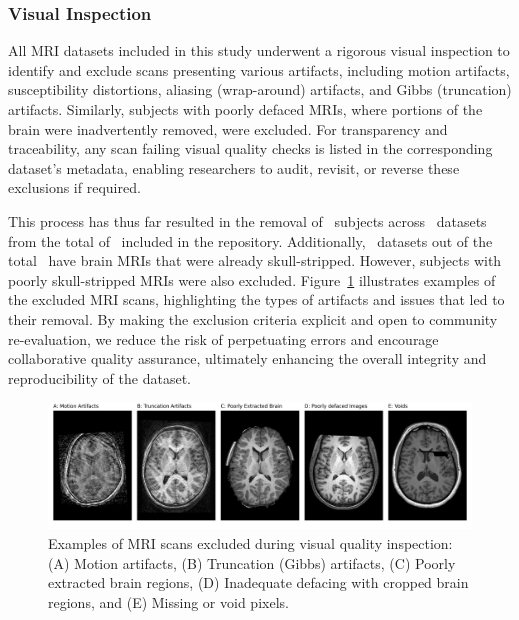 \subsubsection{Visual Inspection}



All MRI datasets included in this study underwent a rigorous visual inspection to identify and exclude scans presenting various artifacts, 
including motion artifacts, susceptibility distortions, aliasing (wrap-around) artifacts, and Gibbs (truncation) artifacts. 
Similarly, subjects with poorly defaced MRIs, where portions of the brain were inadvertently removed, were excluded. For transparency and 
traceability, any scan failing visual quality checks is listed in the corresponding dataset's metadata, enabling researchers to audit, 
revisit, or reverse these exclusions if required.


This process has thus far resulted in the removal of \TotalNumSubjectsRemoved\ subjects across \TotalNumDatasetsWithSubjectsRemoved\ datasets 
from the total of \NumDatasets\ included in the repository. Additionally, \NumDatasetsAlreadySkullStripped\ datasets out of the total \NumDatasets\ 
have brain MRIs that were already skull-stripped. However, subjects with poorly skull-stripped MRIs were also excluded. Figure~\ref{dropped_subject} 
illustrates examples of the excluded MRI scans, highlighting the types of artifacts and issues that led to their removal. By making the exclusion 
criteria explicit and open to community re-evaluation, we reduce the risk of perpetuating errors and encourage collaborative quality assurance, 
ultimately enhancing the overall integrity and reproducibility of the dataset.


\begin{figure}[htbp]\begin{center}\includegraphics[width=\linewidth]{figures/dropped_subjects.png}
    \caption{
        Examples of MRI scans excluded during visual quality inspection:
        (A) Motion artifacts, 
        (B) Truncation (Gibbs) artifacts, 
        (C) Poorly extracted brain regions, 
        (D) Inadequate defacing with cropped brain regions, 
        and (E) Missing or void pixels.
    }
    \label{dropped_subject}\end{center}
\end{figure}

